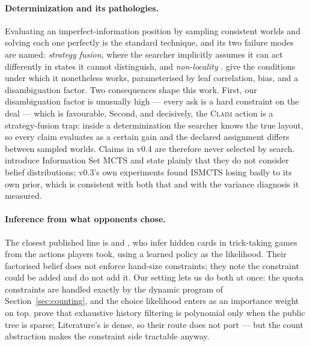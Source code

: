 \documentclass[11pt,a4paper]{article}
\begin{document}
\paragraph{Determinization and its pathologies.} Evaluating an
imperfect-information position by sampling consistent worlds and solving each
one perfectly is the standard technique, and its two failure modes are named:
\emph{strategy fusion}, where the searcher implicitly assumes it can act
differently in states it cannot distinguish, and \emph{non-locality}
\citep{frank1998search}. \citet{long2010understanding} give the conditions under
which it nonetheless works, parameterised by leaf correlation, bias, and a
disambiguation factor. Two consequences shape this work. First, our
disambiguation factor is unusually high --- every ask is a hard constraint on the
deal --- which is favourable. Second, and decisively, the \textsc{Claim} action
is a strategy-fusion trap: inside a determinization the searcher knows the true
layout, so every claim evaluates as a certain gain and the declared assignment
differs between sampled worlds. Claims in v0.4 are therefore never selected by
search. \citet{cowling2012ismcts} introduce Information Set MCTS and state
plainly that they do not consider belief distributions; v0.3's own experiments
found ISMCTS losing badly to its own prior, which is consistent with both that
and with the variance diagnosis it measured.

\paragraph{Inference from what opponents chose.} The closest published line is
\citet{solinas2019improving} and \citet{rebstock2019policy}, who infer hidden
cards in trick-taking games from the actions players took, using a learned
policy as the likelihood. Their factorised belief does not enforce hand-size
constraints; they note the constraint could be added and do not add it. Our
setting lets us do both at once: the quota constraints are handled exactly by
the dynamic program of Section~\ref{sec:counting}, and the choice likelihood
enters as an importance weight on top. \citet{solinas2023history} prove that
exhaustive history filtering is polynomial only when the public tree is sparse;
Literature's is dense, so their route does not port --- but the count abstraction
makes the constraint side tractable anyway.
\end{document}

